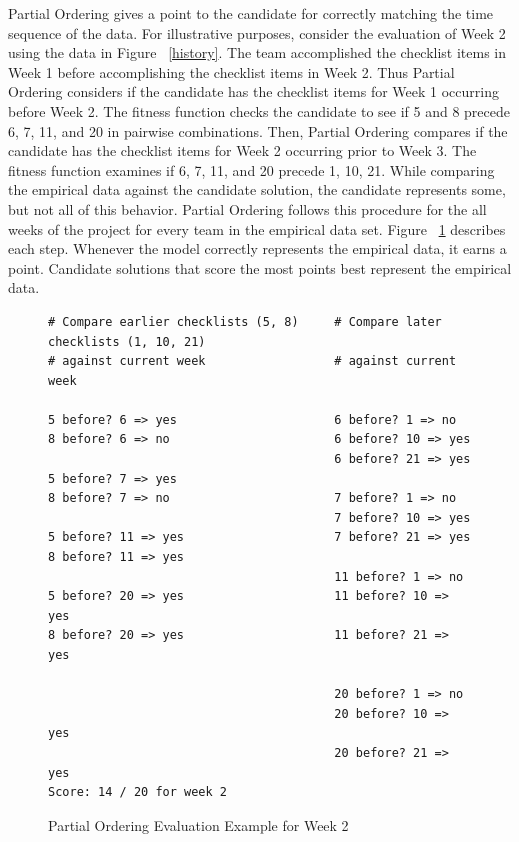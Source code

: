 \documentclass[3p,times,procedia]{elsarticle}
\begin{document}
Partial Ordering gives a point to the candidate for correctly matching the time sequence of the data. For illustrative purposes, consider the evaluation of Week 2 using the data in Figure ~\ref{history}. The team accomplished the checklist items in Week 1 before accomplishing the checklist items in Week 2. Thus Partial Ordering considers if the candidate has the checklist items for Week 1 occurring before Week 2. The fitness function checks the candidate to see if 5 and 8 precede 6, 7, 11, and 20 in pairwise combinations. Then, Partial Ordering compares if the candidate has the checklist items for Week 2 occurring prior to Week 3. The fitness function examines if 6, 7, 11, and 20 precede 1, 10, 21. While comparing the empirical data against the candidate solution, the candidate represents some, but not all of this behavior. Partial Ordering follows this procedure for the all weeks of the project for every team in the empirical data set. Figure ~\ref{evaluation_example} describes each step.
Whenever the model correctly represents the empirical data, it earns a point. Candidate solutions that score the most points best represent the empirical data.

\begin{figure}[!htb]
\begin{verbatim}
# Compare earlier checklists (5, 8)     # Compare later checklists (1, 10, 21)
# against current week                  # against current week

5 before? 6 => yes                      6 before? 1 => no
8 before? 6 => no                       6 before? 10 => yes
                                        6 before? 21 => yes
5 before? 7 => yes                  
8 before? 7 => no                       7 before? 1 => no
                                        7 before? 10 => yes
5 before? 11 => yes                     7 before? 21 => yes
8 before? 11 => yes                     
                                        11 before? 1 => no 
5 before? 20 => yes                     11 before? 10 => yes
8 before? 20 => yes                     11 before? 21 => yes
                                        
                                        20 before? 1 => no
                                        20 before? 10 => yes
                                        20 before? 21 => yes
Score: 14 / 20 for week 2
\end{verbatim}
 \caption{Partial Ordering Evaluation Example for Week 2}
 \label{evaluation_example}
\end{figure}
\end{document}
